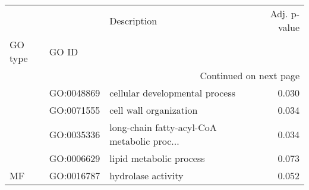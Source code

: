 \begin{longtable}{lllr}
\toprule
   &            &                                  Description &  Adj. p-value \\
GO type & GO ID &                                              &               \\
\midrule
\endhead
\midrule
\multicolumn{4}{r}{{Continued on next page}} \\
\midrule
\endfoot

\bottomrule
\endlastfoot
\multirow{4}{*}{BP} & GO:0048869 &               cellular developmental process &         0.030 \\
   & GO:0071555 &                       cell wall organization &         0.034 \\
   & GO:0035336 &  long-chain fatty-acyl-CoA metabolic proc... &         0.034 \\
   & GO:0006629 &                      lipid metabolic process &         0.073 \\
\cline{1-4}
MF & GO:0016787 &                           hydrolase activity &         0.052 \\
\end{longtable}
